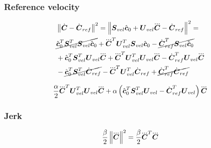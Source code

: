 \subsubsection{Reference velocity}
\begin{equation*}
\begin{split}
    &\norm{\cVel - \cVel_{ref}}^2 
    = 
    \norm{\M{S}_{vel} \cstate_0  +  \M{U}_{vel} \cJerk  -  \cVel_{ref}}^ 2 
    = \\
    & \cancel{\cstate_0^T \M{S}_{vel}^T  \M{S}_{vel} \cstate_0}  
    +  
    \cJerk^T \M{U}_{vel}^T \M{S}_{vel} \cstate_0  
    -  
    \cancel{\cVel_{ref}^T \M{S}_{vel} \cstate_0}\\
%
    & +  
    \cstate_0^T \M{S}_{vel}^T \M{U}_{vel} \cJerk  
    +  
    \cJerk^T \M{U}_{vel}^T \M{U}_{vel} \cJerk   
    -  
    \cVel_{ref}^T \M{U}_{vel} \cJerk\\
%
    & -  
    \cancel{\cstate_0^T \M{S}_{vel}^T \cVel_{ref}}  
    -  
    \cJerk^T \M{U}_{vel}^T \cVel_{ref}  
    +  
    \cancel{\cVel_{ref}^T \cVel_{ref}}
\end{split}
\end{equation*}

\begin{equation*}
    \frac{\alpha}{2} \cJerk^T \M{U}_{vel}^T \M{U}_{vel} \cJerk  
    +  
    \alpha 
    \left(
        \cstate_0^T \M{S}_{vel}^T \M{U}_{vel}
        -
        \cVel_{ref}^T \M{U}_{vel} 
    \right)
    \cJerk 
\end{equation*}

\subsubsection{Jerk}
\begin{equation*}
    \frac{\beta}{2}  \norm{\cJerk}^2 = \frac{\beta}{2} \cJerk^T \cJerk
\end{equation*}

